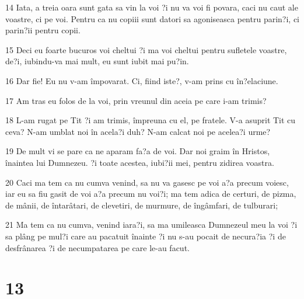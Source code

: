 \par 14 Iata, a treia oara sunt gata sa vin la voi ?i nu va voi fi povara, caci nu caut ale voastre, ci pe voi. Pentru ca nu copiii sunt datori sa agoniseasca pentru parin?i, ci parin?ii pentru copii.
\par 15 Deci eu foarte bucuros voi cheltui ?i ma voi cheltui pentru sufletele voastre, de?i, iubindu-va mai mult, eu sunt iubit mai pu?in.
\par 16 Dar fie! Eu nu v-am împovarat. Ci, fiind iste?, v-am prins cu în?elaciune.
\par 17 Am tras eu folos de la voi, prin vreunul din aceia pe care i-am trimis?
\par 18 L-am rugat pe Tit ?i am trimis, împreuna cu el, pe fratele. V-a asuprit Tit cu ceva? N-am umblat noi în acela?i duh? N-am calcat noi pe acelea?i urme?
\par 19 De mult vi se pare ca ne aparam fa?a de voi. Dar noi graim în Hristos, înaintea lui Dumnezeu. ?i toate acestea, iubi?ii mei, pentru zidirea voastra.
\par 20 Caci ma tem ca nu cumva venind, sa nu va gasesc pe voi a?a precum voiesc, iar eu sa fiu gasit de voi a?a precum nu voi?i; ma tem adica de certuri, de pizma, de mânii, de întarâtari, de clevetiri, de murmure, de îngâmfari, de tulburari;
\par 21 Ma tem ca nu cumva, venind iara?i, sa ma umileasca Dumnezeul meu la voi ?i sa plâng pe mul?i care au pacatuit înainte ?i nu s-au pocait de necura?ia ?i de desfrânarea ?i de necumpatarea pe care le-au facut.

\chapter{13}


